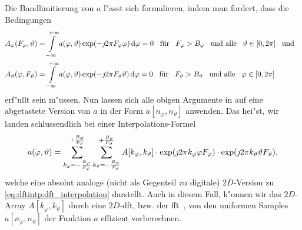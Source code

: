 Die Bandlimitierung von $a$ l"asst sich formulieren, indem man fordert, dass die Bedingungen
\begin{align}
    A_{\varphi}(F_\varphi, \vartheta) 
    &= {\int\limits_{-\infty}^{+\infty}{
        a(\varphi, \vartheta) \exp(-\jmath 2 \pi F_\varphi \varphi)
    }\,\mathrm{d}{\varphi}} = 0 
    {\hspace{3mm} \text{f\"ur} \hspace{3mm}} F_\varphi > B_\varphi {\hspace{3mm} \text{und alle} \hspace{3mm}} \vartheta \in [0, 2 \pi] {\hspace{3mm} \text{und} \hspace{3mm}} \\
    A_{\vartheta}(\varphi, F_\vartheta) 
    &= {\int\limits_{-\infty}^{+\infty}{
        a(\varphi, \vartheta) \exp(-\jmath 2 \pi F_\vartheta \vartheta)
    }\,\mathrm{d}{\varphi}} = 0 
    {\hspace{3mm} \text{f\"ur} \hspace{3mm}} F_\vartheta > B_\vartheta {\hspace{3mm} \text{und alle} \hspace{3mm}} \varphi \in [0, 2 \pi]
\end{align}
erf"ullt sein m"ussen.
Nun lassen sich alle obigen Argumente in   auf eine abgetastete Version von $a$ in der Form $a[n_\varphi, n_\vartheta]$ anwenden. 
Das hei"st, wir landen schlussendlich bei einer Interpolations-Formel
\begin{equation}\label{eq:eadf:2d_dft_interpolation}
    a(\varphi, \vartheta) = {\sum\limits_{k_\varphi=-\frac{B_\varphi}{F_\varphi}}^{+\frac{B_\varphi}{F_\varphi}}{
        {\sum\limits_{k_\vartheta=-\frac{B_\vartheta}{F_\vartheta}}^{+\frac{B_\vartheta}{F_\vartheta}}{
            A[k_\varphi, k_\vartheta] 
            \cdot \exp(\jmath 2 \pi k_\varphi \varphi F_\varphi)
            \cdot \exp(\jmath 2 \pi k_\vartheta \vartheta F_\vartheta)
        }}
    }},
\end{equation}
welche eine absolut analoge (nicht als Gegenteil zu digitale) $2D$-Version zu \eqref{eq:dftintp:dft_interpolation} darstellt.
Auch in diesem Fall, k"onnen wir das $2D$-Array $A[k_\varphi, k_\vartheta]$ durch eine $2D$-\gls{dft}, bzw. der \gls{fft}~\cite{FFTW05}, von den uniformen Samples $a[n_\varphi, n_\vartheta]$ der Funktion $a$ effizient vorberechnen.

